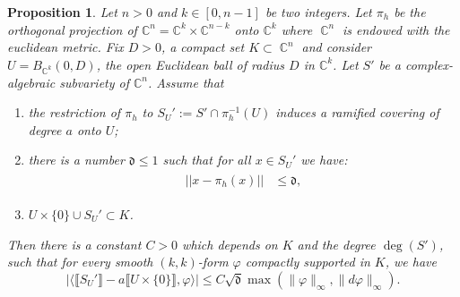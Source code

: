 \documentclass[12pt]{amsbook}%
\newtheorem{prop}[thm]{Proposition}
\theoremstyle{definition}
\theoremstyle{remark}
\numberwithin{section}{chapter}
\numberwithin{subsection}{section}
\numberwithin{figure}{chapter}
\DeclareMathOperator{\C}{\mathbb{C}}
\DeclareMathOperator{\vol}{vol}
\def\dyl{>0}
\def\bC{{\mathbb{C}}}
\def\fd{{\mathfrak{d}}}
\def\kap{}
\begin{document}
{{ \begin{prop}\label{prop_subvariety_smaller_cylinder}
Let $n\dyl$ and $k\in [0,n-1]$ be two integers. Let $\pi_h$ be the orthogonal projection of $\bC^n=\bC^k\times \bC^{n-k}$ onto $\bC^k$ where $\C^n$ is endowed with the euclidean metric. 
Fix $D\dyl$, a compact set $K\subset \C^n$ and consider $U=B_{\C^k}(0,D)$, the open Euclidean ball of radius $D$ in $\bC^k$. 
Let $S'$ be a complex-algebraic subvariety of $\bC^n$. 
Assume that 
\begin{enumerate}
\item[(i)] the restriction of $\pi_h$ to $S_U':= S'\cap \pi_h^{-1}(U)$ induces a ramified covering of degree $a$ onto $U$; 
\item[(ii)]
there is a number $\fd \leqslant  1$  such that for all $x\in S_U'$ we have:
\begin{align*}
\begin{aligned}
||x- \pi_h(x)||& \leqslant \fd, 
\end{aligned}
\end{align*}

\item[(iii)] $U \times \{0 \}\cup S_U'\subset K$.
\end{enumerate}

Then there is a constant $C> 0$ which depends on $K$ and the degree $\deg(S')$, such that   for 
every smooth $(k,k)$-form $\varphi$ compactly supported in $K$, 
we have
\[
\left\lvert\langle \llbracket S_U' \rrbracket - a\llbracket U  \times \{0\} \rrbracket, \varphi \rangle\right\rvert \leqslant {C\sqrt{\fd}} \max(  \lVert \varphi \rVert_{\infty}, \lVert d\varphi\rVert_\infty).
\]
\end{prop}



}}
\end{document}
